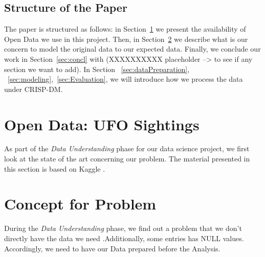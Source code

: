 \documentclass[11pt, journal]{IEEEtran}
\begin{document}
\subsection{Structure of the Paper} \label{subsec:struct}
The paper is structured as follows: in Section~\ref{sec:dataunderstanding} we present the availability of Open Data we use in this project.
Then, in Section~\ref{sec:concept} we describe what is our concern to model the original data to our expected data. Finally, we conclude our work in Section~\ref{sec:concl} with (XXXXXXXXXX placeholder --> to see if any section we want to add).
In Section ~\ref{sec:dataPreparation}, ~\ref{sec:modeling},~\ref{sec:Evaluation}, we will introduce how we process the data under CRISP-DM.


\section{Open Data: UFO Sightings} \label{sec:dataunderstanding}
As part of the \emph{Data Understanding} phase for our data science project, we first look at the state
of the art concerning our problem. The material presented in this section is based on Kaggle \cite{kaggle}.

\section{Concept for Problem} \label{sec:concept}
During the \emph{Data Understanding} phase, we find out a problem that we don't directly have the data we need .Additionally, some entries has NULL values. Accordingly, we need to have our Data prepared before the Analysis.
\end{document}

